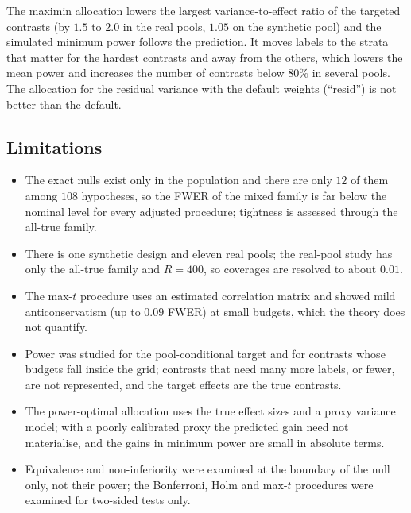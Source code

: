 \documentclass[pdflatex,sn-mathphys-num,iicol]{sn-jnl}
\theoremstyle{thmstyleone}
\theoremstyle{thmstyletwo}
\theoremstyle{thmstylethree}
\begin{document}
The maximin allocation lowers the largest variance-to-effect ratio of the targeted contrasts (by $1.5$ to $2.0$ in the real pools, $1.05$ on the synthetic pool) and the simulated minimum power follows the prediction. It moves labels to the strata that matter for the hardest contrasts and away from the others, which lowers the mean power and increases the number of contrasts below $80\%$ in several pools. The allocation for the residual variance with the default weights (``resid'') is not better than the default.

\subsection{Limitations}
\begin{itemize}
\item The exact nulls exist only in the population and there are only $12$ of them among $108$ hypotheses, so the FWER of the mixed family is far below the nominal level for every adjusted procedure; tightness is assessed through the all-true family.
\item There is one synthetic design and eleven real pools; the real-pool study has only the all-true family and $R=400$, so coverages are resolved to about $0.01$.
\item The max-$t$ procedure uses an estimated correlation matrix and showed mild anticonservatism (up to $0.09$ FWER) at small budgets, which the theory does not quantify.
\item Power was studied for the pool-conditional target and for contrasts whose budgets fall inside the grid; contrasts that need many more labels, or fewer, are not represented, and the target effects are the true contrasts.
\item The power-optimal allocation uses the true effect sizes and a proxy variance model; with a poorly calibrated proxy the predicted gain need not materialise, and the gains in minimum power are small in absolute terms.
\item Equivalence and non-inferiority were examined at the boundary of the null only, not their power; the Bonferroni, Holm and max-$t$ procedures were examined for two-sided tests only.
\end{itemize}

\end{document}
